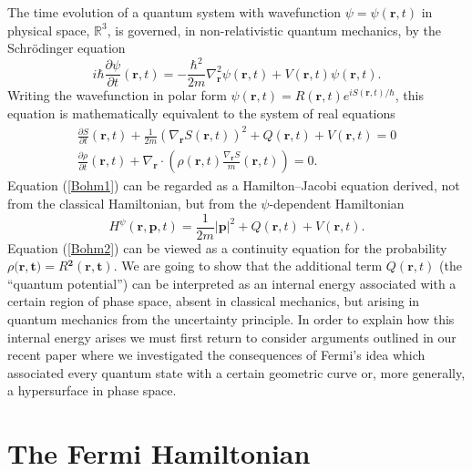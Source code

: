 \documentclass[12pt]{article}%
\begin{document}
The time evolution of a quantum system with wavefunction $\psi=\psi
(\mathbf{r},t)$ in physical space, $\mathbb{R}^{3}$, is governed, in
non-relativistic quantum mechanics, by the Schr\"{o}dinger equation
\begin{equation}
i\hbar\frac{\partial\psi}{\partial t}(\mathbf{r},t)=-\frac{\hbar^{2}}%
{2m}\nabla_{\mathbf{r}}^{2}\psi(\mathbf{r},t)+V(\mathbf{r},t)\psi
(\mathbf{r},t). \label{schr1}%
\end{equation}
Writing the wavefunction in polar form $\psi(\mathbf{r},t)=R(\mathbf{r}%
,t)e^{iS(\mathbf{r},t)/\hbar}$, this equation is mathematically equivalent to
the system of real equations
\begin{gather}
\frac{\partial S}{\partial t}(\mathbf{r},t)+\frac{1}{2m}(\nabla_{\mathbf{r}%
}S(\mathbf{r},t))^{2}+Q(\mathbf{r},t)+V(\mathbf{r},t)=0\label{Bohm1}\\
\frac{\partial\rho}{\partial t}(\mathbf{r},t)+\nabla_{\mathbf{r}}\cdot\left(
\rho(\mathbf{r},t)\frac{\nabla_{\mathbf{r}}S}{m}(\mathbf{r},t)\right)  =0.
\label{Bohm2}%
\end{gather}
Equation (\ref{Bohm1}) can be regarded as a Hamilton--Jacobi equation derived,
not from the classical Hamiltonian, but from the $\psi$-dependent Hamiltonian%
\[
H^{\psi}(\mathbf{r},\mathbf{p},t)=\frac{1}{2m}|\mathbf{p}|^{2}+Q(\mathbf{r}%
,t)+V(\mathbf{r},t)\text{.}%
\]
Equation (\ref{Bohm2}) can be viewed as a continuity equation for the
probability $\rho(\mathbf{r,t)}=R\mathbf{^{2}(r,t)}$. We are going to show
that the additional term $Q(\mathbf{r},t)$ (the \textquotedblleft quantum
potential\textquotedblright) can be interpreted as an internal energy
associated with a certain region of phase space, absent in classical
mechanics, but arising in quantum mechanics from the uncertainty principle. In
order to explain how this internal energy arises we must first return to
consider arguments outlined in our recent paper \cite{degohi14} where we
investigated the consequences of Fermi's idea \cite{Fermi} which associated
every quantum state with a certain geometric curve or, more generally, a
hypersurface in phase space.

\section{The Fermi Hamiltonian}
\end{document}
